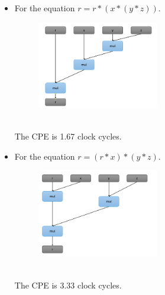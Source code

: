 \documentclass{article}
\begin{document}
\begin{itemize}
	\item For the equation $r = r*(x*(y*z))$. \\
	\begin{figure}[h]
		\centering
		\includegraphics[width=0.5\textwidth]{fig4}
	\end{figure} \\
	The CPE is 1.67 clock cycles.
	\item For the equation $r = (r*x)*(y*z)$. \\
	\begin{figure}[h]
		\centering
		\includegraphics[width=0.5\textwidth]{fig5}
	\end{figure} \\
	The CPE is 3.33 clock cycles. 
\end{itemize}
\end{document}
